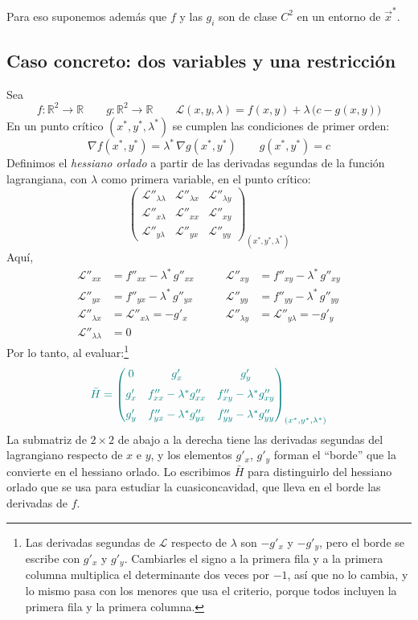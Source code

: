\documentclass{article}
\newcommand{\R}{\ensuremath{\mathbb{R}}}
\newcommand{\vect}[1]{\vec{#1}}
\begin{document}
Para eso suponemos además que \(f\) y las \(g_i\) son de clase \(C^2\) en un entorno de \(\vect{x}^*\).

\subsection*{Caso concreto: dos variables y una restricción}

Sea
\[
f\colon\R^2\to\R
\qquad
g\colon\R^2\to\R
\qquad
\mathcal L(x,y,\lambda)=f(x,y)+\lambda\,\bigl(c-g(x,y)\bigr)
\]
En un punto crítico \((x^*,y^*,\lambda^*)\) se cumplen las condiciones de primer orden:
\[
\nabla f(x^*,y^*)=\lambda^*\,\nabla g(x^*,y^*)
\qquad
g(x^*,y^*)=c
\]
Definimos el \emph{hessiano orlado} a partir de las derivadas segundas de la función lagrangiana, con \(\lambda\) como primera variable, en el punto crítico:
\[
\begin{pmatrix}
\mathcal L''_{\lambda\lambda} & \mathcal L''_{\lambda x} & \mathcal L''_{\lambda y} \\[6pt]
\mathcal L''_{x\lambda} & \mathcal L''_{xx} & \mathcal L''_{xy} \\[6pt]
\mathcal L''_{y\lambda} & \mathcal L''_{yx} & \mathcal L''_{yy}
\end{pmatrix}_{(x^*,y^*,\lambda^*)}
\]
Aquí,
\[
\begin{aligned}
\mathcal L''_{xx}&=f''_{xx}-\lambda^*\,g''_{xx}
&\qquad
\mathcal L''_{xy}&=f''_{xy}-\lambda^*\,g''_{xy}\\
\mathcal L''_{yx}&=f''_{yx}-\lambda^*\,g''_{yx}
&\qquad
\mathcal L''_{yy}&=f''_{yy}-\lambda^*\,g''_{yy}\\[4pt]
\mathcal L''_{\lambda x}&=\mathcal L''_{x\lambda}=-g'_x
&\qquad
\mathcal L''_{\lambda y}&=\mathcal L''_{y\lambda}=-g'_y\\[4pt]
\mathcal L''_{\lambda\lambda}&=0
\end{aligned}
\]
Por lo tanto, al evaluar:\footnote{Las derivadas segundas de \(\mathcal L\) respecto de \(\lambda\) son \(-g'_x\) y \(-g'_y\), pero el borde se escribe con \(g'_x\) y \(g'_y\). Cambiarles el signo a la primera fila y a la primera columna multiplica el determinante dos veces por \(-1\), así que no lo cambia, y lo mismo pasa con los menores que usa el criterio, porque todos incluyen la primera fila y la primera columna.}
\[\color{teal}
\bar H
=
\begin{pmatrix}
0 & g'_x & g'_y \\[6pt]
g'_x & f''_{xx}-\lambda^*g''_{xx} & f''_{xy}-\lambda^*g''_{xy} \\[6pt]
g'_y & f''_{yx}-\lambda^*g''_{yx} & f''_{yy}-\lambda^*g''_{yy}
\end{pmatrix}_{(x^*,y^*,\lambda^*)}
\]
La submatriz de \(2\times2\) de abajo a la derecha tiene las derivadas segundas del lagrangiano respecto de \(x\) e \(y\), y los elementos \(g'_x\), \(g'_y\) forman el “borde” que la convierte en el hessiano orlado. Lo escribimos \(\bar H\) para distinguirlo del hessiano orlado que se usa para estudiar la cuasiconcavidad, que lleva en el borde las derivadas de \(f\).
\end{document}
